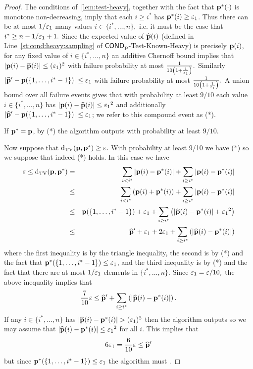 \begin{proof}
The conditions of~\cref{lem:test-heavy}, together with the fact that
$\mathbf{p}^\ast(\cdot)$ is monotone non-decreasing, imply
that each $i \geq i^\ast$ has $\D^\ast(i) \geq {\eps_1}$.  Thus there can
be at most $1/{\varepsilon_1}$ many values $i \in \{i^\ast,\dots,n\},$
i.e. it must be the case that $i^\ast \geq n - 1/{\varepsilon_1} + 1.$
Since the expected value of $\widehat{\mathbf{p}}(i)$ (defined in Line~\ref{st:cond:heavy:sampling} of
{\sc ${\sf COND}_{\mathbf{p}}$-Test-Known-Heavy}) is precisely $\mathbf{p}(i)$,
for any fixed value of $i \in \{i^\ast,\dots,n\}$
an additive Chernoff bound implies that $|\mathbf{p}(i) - \widehat{\mathbf{p}}(i)|
\leq ({\varepsilon_1})^2$
with failure probability at most ${\frac{1}{10
\left(1 + {\frac{1}{{\varepsilon_1}}}\right)}}.$
Similarly $|\widehat{\D}' - \D(\{1,\dots,i^\ast-1\})| \leq {\eps_1}$
with failure probability at most ${\frac{1}{10
\left(1 + {\frac{1}{{\varepsilon_1}}}\right)}}.$
A union bound over all failure events  gives that with probability at least
$9/10$ each value $i \in \{i^\ast,\dots,n\}$ has $|\D(i) - \widehat{\D}(i)|
\leq {\eps_1}^2$ and additionally $|\widehat{\D}' - \D(\{1,\dots,i^\ast-1\})|
\leq {\eps_1}$; we refer to this compound event as (*).


If $\mathbf{p}^\ast = \mathbf{p}$, by (*) the algorithm
outputs \accept with probability at least $9/10.$

Now suppose that $\operatorname{d}_{\textrm{TV}}(\mathbf{p},\mathbf{p}^\ast) \geq \varepsilon.$  With probability at least 9/10 we have (*) so we suppose that indeed (*) holds.  In this case we have
\begin{eqnarray*}
\varepsilon \leq \operatorname{d}_{\textrm{TV}}(\mathbf{p},\mathbf{p}^\ast) &=& \sum_{i < i^\ast} |\mathbf{p}(i)-\mathbf{p}^\ast(i)| +
\sum_{i \geq i^\ast} |\mathbf{p}(i) - \mathbf{p}^\ast(i)|\\
&\leq& \sum_{i < i^\ast} \left(\mathbf{p}(i) + \mathbf{p}^\ast(i) \right) +   \sum_{i \geq i^\ast} |\mathbf{p}(i) - \mathbf{p}^\ast(i)|\\
&\leq& \mathbf{p}(\{1,\dots,i^\ast-1\}) + {\varepsilon_1}  + \sum_{i \geq i^\ast} \left(|\widehat{\mathbf{p}}(i) - \mathbf{p}^\ast(i)|
+ {\varepsilon_1}^2\right)\\
&\leq& \widehat{\mathbf{p}}' + {\varepsilon_1} + 2{\varepsilon_1}  + \sum_{i \geq i^\ast} \left(|\widehat{\mathbf{p}}(i) - \mathbf{p}^\ast(i)|\right)\\
\end{eqnarray*}
where the first inequality is by the triangle inequality, the second is by (*) and the fact that
$\D^\ast(\{1,\dots,i^\ast-1\}) \leq {\eps_1}$, and the third inequality is by (*) and the
fact that there are at most $1/{\varepsilon_1}$ elements in $\{i^\ast,\dots,n\}.$  Since
${\varepsilon_1} = \varepsilon/10,$ the above inequality implies that
\[
{\frac 7 {10}} \varepsilon \leq \widehat{\mathbf{p}}' +
\sum_{i \geq i^\ast} \left(|\widehat{\mathbf{p}}(i) - \mathbf{p}^\ast(i)|\right).
\]
If any $i \in \{i^\ast,\dots,n\}$ has $|\widehat{\mathbf{p}}(i) - \mathbf{p}^\ast(i)| > ({\varepsilon_1})^2$ then the
algorithm outputs \reject so we may assume that $|\widehat{\D}(i) - \D^\ast(i)| \leq {\eps_1}^2$ for all $i$.
This implies that
\[
6 {\varepsilon_1} = {\frac 6 {10}} \varepsilon \leq \widehat{\mathbf{p}}'
\]
but since $\D^\ast(\{1,\dots,i^\ast-1\}) \leq {\eps_1}$ the algorithm must \reject.
\end{proof}

